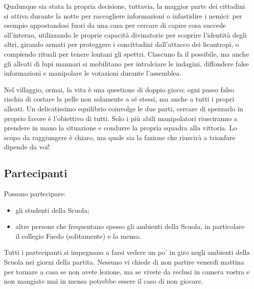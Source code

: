 \documentclass[a4paper,10pt]{article}
\begin{document}
Qualunque sia stata la propria decisione, tuttavia, la maggior parte dei cittadini si attiva durante la notte per raccogliere informazioni o infastidire i nemici: per esempio appostandosi fuori da una casa per cercare di capire cosa succede all'interno, utilizzando le proprie capacità divinatorie per scoprire l'identità degli altri, girando armati per proteggere i concittadini dall'attacco dei licantropi, o compiendo rituali per tenere lontani gli spettri. Ciascuno fa il possibile, ma anche gli alleati di lupi mannari si mobilitano per intralciare le indagini, diffondere false informazioni e manipolare le votazioni durante l'assemblea.

Nel villaggio, ormai, la vita è una questione di doppio gioco; ogni passo falso rischia di costare la pelle non solamente a sé stessi, ma anche a tutti i propri alleati. Un delicatissimo equilibrio coinvolge le due parti, cercare di spezzarlo in proprio favore è l'obiettivo di tutti. Solo i più abili manipolatori riusciranno a prendere in mano la situazione e condurre la propria squadra alla vittoria. Lo scopo da raggiungere è chiaro, ma quale sia la fazione che riuscirà a trionfare dipende da voi!

\subsection{Partecipanti}

Possono partecipare:

\begin{itemize}
      \item gli studenti della Scuola;
      \item altre persone che frequentano spesso gli ambienti della Scuola, in particolare il collegio Faedo (solitamente) e la mensa.
\end{itemize}

Tutti i partecipanti si impegnano a farsi vedere un po' in giro negli ambienti della Scuola nei giorni della partita. Nessuno vi chiede di non partire venerdì mattina per tornare a casa se non avete lezione, ma se vivete da reclusi in camera vostra e non mangiate mai in mensa potrebbe essere il caso di non giocare.

% 
% 
\end{document}
